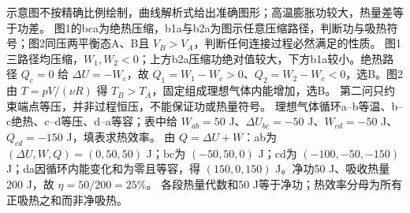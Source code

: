 \crosscheck 示意图不按精确比例绘制，曲线解析式给出准确图形；高温膨胀功较大，热量差等于功差。
\problemtext 图1的bca为绝热压缩，b1a与b2a为图示任意压缩路径，判断功与吸热符号；图2同压两平衡态A、B且 $V_B>V_A$，判断任何连接过程必然满足的性质。
\workings 图1三路径均压缩，$W_1,W_2<0$；上方b2a压缩功绝对值较大，下方b1a较小。绝热路径 $Q_c=0$ 给 $\Delta U=-W_c$，故 $Q_1=W_1-W_c>0$、$Q_2=W_2-W_c<0$，选B。图2由 $T=pV/(\nu R)$ 得 $T_B>T_A$，固定组成理想气体内能增加，选B。
\crosscheck 第二问只约束端点等压，并非过程恒压，不能保证功或热量符号。
\problemtext 理想气体循环a--b等温、b--c绝热、c--d等压、d--a等容；表中给 $W_{ab}=50$ J、$\Delta U_{bc}=-50$ J、$W_{cd}=-50$ J、$Q_{cd}=-150$ J，填表求热效率。
\workings 由 $Q=\Delta U+W$：ab为 $(\Delta U,W,Q)=(0,50,50)$ J；bc为 $(-50,50,0)$ J；cd为 $(-100,-50,-150)$ J；da因循环内能变化和为零且等容，得 $(150,0,150)$ J。净功50 J、吸收热量200 J，故 $\eta=50/200=25\%$。
\crosscheck 各段热量代数和50 J等于净功；热效率分母为所有正吸热之和而非净吸热。

